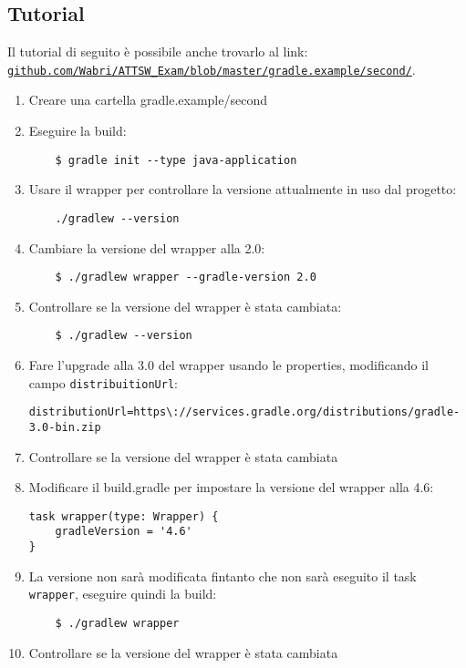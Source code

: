 \subsection{Tutorial}
Il tutorial di seguito è possibile anche trovarlo al link: \href{https://github.com/Wabri/ATTSW_Exam/blob/master/gradle.example/first/}{\texttt{github.com/Wabri/ATTSW\_Exam/blob/master/gradle.example/second/}}.
\begin{enumerate}
    \item Creare una cartella gradle.example/second
    \item Eseguire la build:
\begin{verbatim}
    $ gradle init --type java-application
\end{verbatim}
    \item Usare il wrapper per controllare la versione attualmente in uso dal progetto:
\begin{verbatim}
    ./gradlew --version\end{verbatim}
    \item Cambiare la versione del wrapper alla 2.0:
\begin{verbatim}
    $ ./gradlew wrapper --gradle-version 2.0\end{verbatim}
    \item Controllare se la versione del wrapper è stata cambiata:
\begin{verbatim}
    $ ./gradlew --version\end{verbatim}
    \item Fare l'upgrade alla 3.0 del wrapper usando le properties, modificando il campo \texttt{distribuitionUrl}:
\begin{verbatim}
distributionUrl=https\://services.gradle.org/distributions/gradle-3.0-bin.zip \end{verbatim}
    \item Controllare se la versione del wrapper è stata cambiata
    \item Modificare il build.gradle per impostare la versione del wrapper alla 4.6:
\begin{lstlisting}[frame=single]
task wrapper(type: Wrapper) {
    gradleVersion = '4.6'
}
\end{lstlisting}
    \item La versione non sarà modificata fintanto che non sarà eseguito il task \texttt{wrapper}, eseguire quindi la build:
\begin{verbatim}
    $ ./gradlew wrapper\end{verbatim}
    \item Controllare se la versione del wrapper è stata cambiata

\end{enumerate}
